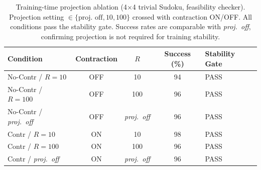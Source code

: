 \begin{table}[t]
\caption{Training-time projection ablation (4$\times$4 trivial Sudoku, feasibility checker). 
Projection setting $\in\{\text{proj.\ off}, 10, 100\}$ crossed with contraction ON/OFF.
All conditions pass the stability gate.
Success rates are comparable with \emph{proj.\ off}, confirming projection is not required for training stability.}
\label{tab:exp3_projection_ablation}
\centering
\small
\begin{tabular}{@{}lcccl@{}}
\toprule
Condition & Contraction & $R$ & Success (\%) & Stability Gate \\
\midrule
No-Contr / $R{=}10$ & OFF & 10 & 94 & PASS \\
No-Contr / $R{=}100$ & OFF & 100 & 96 & PASS \\
No-Contr / \emph{proj.\ off} & OFF & \emph{proj.\ off} & 96 & PASS \\
Contr / $R{=}10$ & ON & 10 & 98 & PASS \\
Contr / $R{=}100$ & ON & 100 & 96 & PASS \\
Contr / \emph{proj.\ off} & ON & \emph{proj.\ off} & 96 & PASS \\
\bottomrule
\end{tabular}
\end{table}
